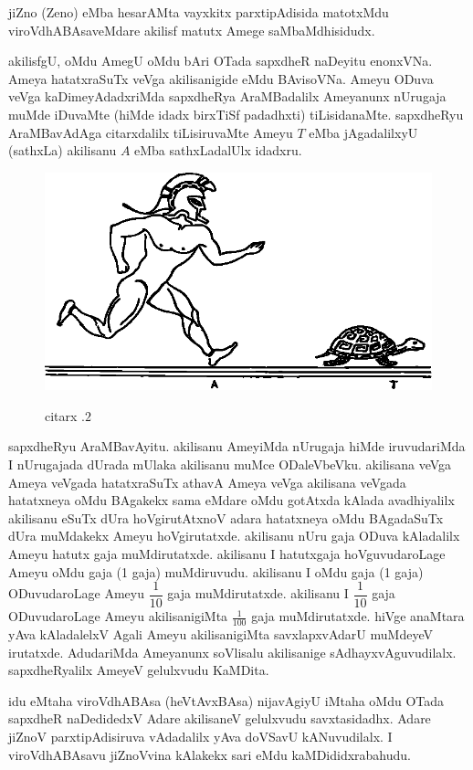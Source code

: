 jiZno {\rm (Zeno)} eMba hesarAMta vayxkitx parxtipAdisida matotxMdu viroVdhABAsa\-veMdare akilisf matutx Amege saMbaMdhisidudx.

akilisfgU, oMdu AmegU oMdu bAri OTada sapxdheR naDeyitu enonxVNa. Ameya hatatxraSuTx veVga akilisanigide eMdu BAvisoVNa. Ameyu ODuva veVga kaDimeyAdadxriMda sapxdheRya AraMBadalilx Ameyanunx nUrugaja muMde iDuvaMte (hiMde idadx birxTiSf padadhxti) tiLisidanaMte. sapxdheRyu AraMBavAdAga citarxdalilx tiLisiruvaMte Ameyu $T$ eMba jAgadalilxyU (sathxLa) akilisanu $A$ eMba sathxLadalUlx idadxru. 
\begin{figure}[H]
\centering
\includegraphics[scale=.65]{src/figures/m_085.eps}\\[-0.3cm]
\caption*{citarx .$2$}
\end{figure}

sapxdheRyu AraMBavAyitu. akilisanu AmeyiMda nUrugaja hiMde iruvuda\-riMda I nUrugajada dUrada mUlaka akilisanu muMce ODaleVbeVku. akilisana veVga Ameya veVgada hatatxraSuTx athavA Ameya veVga akilisana veVgada hatatxneya oMdu BAgakekx sama eMdare oMdu gotAtxda kAlada avadhiyalilx akilisanu eSuTx dUra hoVgirutAtxnoV adara hatatxneya oMdu BAgadaSuTx dUra muMdakekx Ameyu hoVgirutatxde. akilisanu nUru gaja ODuva kAladalilx Ameyu hatutx gaja muMdirutatxde. akilisanu I hatutxgaja hoVguvudaroLage Ameyu oMdu gaja ({\rm 1} gaja) muMdiruvudu. akilisanu I oMdu gaja ({\rm 1} gaja) ODuvudaroLage Ameyu $\dfrac{1}{10}$ gaja muMdirutatxde. akilisanu I $\dfrac{1}{10}$ gaja ODuvudaroLage Ameyu akilisanigiMta $\frac{1}{100}$ gaja muMdirutatxde. hiVge anaMtara yAva kAladalelxV Agali Ameyu akilisanigiMta savxlapxvAdarU muMdeyeV irutatxde. AdudariMda Ameyanunx soVlisalu akilisanige sAdhayxvAguvudilalx. sapxdheRyalilx AmeyeV gelulxvudu KaMDita.
\vskip 3pt

idu eMtaha viroVdhABAsa (heVtAvxBAsa) nijavAgiyU iMtaha oMdu OTada sapxdheR naDedidedxV Adare akilisaneV gelulxvudu savxtasidadhx. Adare jiZnoV parxtipAdisiruva vAdadalilx yAva doVSavU kANuvudilalx. I viroVdhABAsavu  jiZnoVvina kAlakekx sari eMdu kaMDididxrabahudu.
\vskip 3pt

